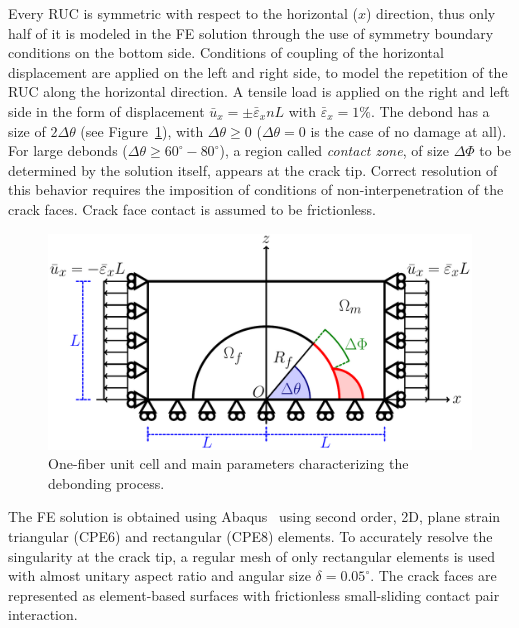 \documentclass[12pt,a4paper]{article}
\begin{document}
Every RUC is symmetric with respect to the horizontal ($x$) direction, thus only half of it is modeled in the FE solution through the use of symmetry boundary conditions on the bottom side. Conditions of coupling of the horizontal displacement are applied on the left and right side, to model the repetition of the RUC along the horizontal direction. A tensile load is applied on the right and left side in the form of displacement $\bar{u}_{x}=\pm\bar{\varepsilon}_{x}nL$ with $\bar{\varepsilon}_{x}=1\%$. The debond has a size of $2\Delta\theta$ (see Figure~\ref{fig:ruc}), with $\Delta\theta\geq0$ ($\Delta\theta=0$ is the case of no damage at all). For large debonds ($\Delta\theta\geq 60^{\circ}-80^{\circ}$), a region called \emph{contact zone}, of size $\Delta\Phi$ to be determined by the solution itself, appears at the crack tip. Correct resolution of this behavior requires the imposition of conditions of non-interpenetration of the crack faces. Crack face contact is assumed to be frictionless.

\begin{figure}[!h]
\centering
        \includegraphics[height=0.25\textheight]{RUC.pdf}
\caption{One-fiber unit cell and main parameters characterizing the debonding process.}\label{fig:ruc}
\end{figure}

The FE solution is obtained using Abaqus~\cite{abq12} using second order, 2D, plane strain triangular (CPE6) and rectangular (CPE8) elements. To accurately resolve the singularity at the crack tip, a regular mesh of only rectangular elements is used with almost unitary aspect ratio and angular size $\delta=0.05^{\circ}$. The crack faces are represented as element-based surfaces with frictionless small-sliding contact pair interaction.
\end{document}
